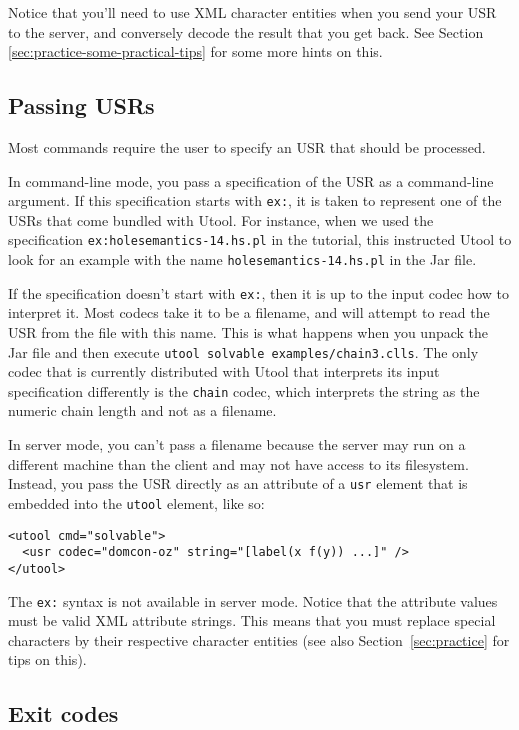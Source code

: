 Notice that you'll need to use XML character entities when you send your USR to the server, and conversely decode the result that you get back. See Section \ref{sec:practice-some-practical-tips} for some more hints on this.



\subsection{Passing USRs}

Most commands require the user to specify an USR that should be
processed.

In command-line mode, you pass a specification of the USR as a
command-line argument. If this specification starts with \verb?ex:?, it is taken to represent one of the USRs that come bundled with Utool. For instance, when we used the specification \verb?ex:holesemantics-14.hs.pl? in the tutorial, this instructed Utool to look for an example with the name \verb?holesemantics-14.hs.pl? in the Jar file.

If the specification doesn't start with \verb?ex:?, then it is up to the input codec how to interpret it. Most codecs take it to be a filename, and will attempt to read the USR from the file with this name. This is what happens when you unpack the Jar file and then execute \verb?utool solvable examples/chain3.clls?. The only codec that is currently distributed with Utool that interprets its input specification differently is the \verb?chain? codec, which interprets the string as the numeric chain length and not as a filename.

In server mode, you can't pass a filename because the server may run
on a different machine than the client and may not have access to its
filesystem. Instead, you pass the USR directly as an attribute of a
\verb?usr? element that is embedded into the \verb?utool? element,
like so:

\begin{verbatim}
<utool cmd="solvable">
  <usr codec="domcon-oz" string="[label(x f(y)) ...]" />
</utool>
\end{verbatim}

The \verb?ex:? syntax is not available in server mode. Notice that the attribute values must be valid XML attribute
strings. This means that you must replace special characters by
their respective character entities (see also
Section~\ref{sec:practice} for tips on this).


\subsection{Exit codes} \label{sec:operations-exitcodes}


